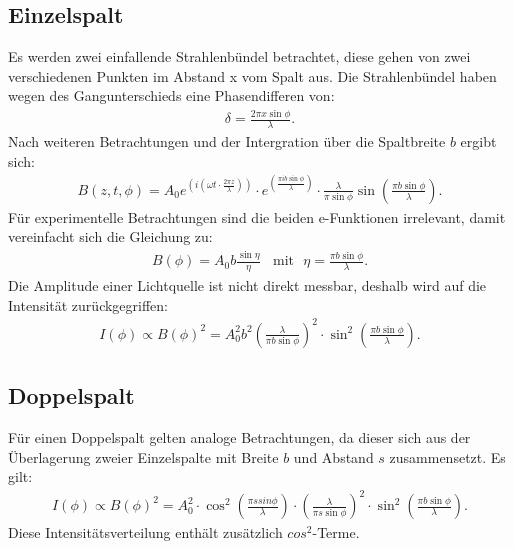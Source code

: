 \subsection{Einzelspalt}
Es werden zwei einfallende Strahlenbündel betrachtet, diese gehen von zwei verschiedenen Punkten im Abstand x vom
Spalt aus. Die Strahlenbündel haben wegen des Gangunterschieds eine Phasendifferen von:
\begin{align}
\delta = \frac{2\pi x \sin\phi}{\lambda}.
\end{align}
Nach weiteren Betrachtungen und der Intergration über die Spaltbreite $b$ ergibt sich:
\begin{align}
B(z,t,\phi)=A_0 e^{\left(i\left(\omega t\cdot\frac{2\pi z}{\lambda}\right)\right)}\cdot e^{\left(\frac{\pi i b\sin\phi}{\lambda}\right)}\cdot\frac{\lambda}{\pi\sin\phi}\sin\left(\frac{\pi b \sin\phi}{\lambda}\right).
\end{align}
Für experimentelle Betrachtungen sind die beiden e-Funktionen irrelevant, damit vereinfacht sich die Gleichung zu:
\begin{align}
B(\phi)=A_0 b \frac{\sin \eta}{\eta} \ \ \ \ \text{mit} \ \ \ \eta=\frac{\pi b \sin \phi}{\lambda}.
\end{align}
Die Amplitude einer Lichtquelle ist nicht direkt messbar, deshalb wird auf die Intensität zurückgegriffen:
\begin{align}
I(\phi)\propto B(\phi)^2 = A_0^2 b^2\left(\frac{\lambda}{\pi b \sin\phi}\right)^2\cdot\sin^2\left(\frac{\pi b \sin\phi}{\lambda}\right).\label{eqn:einzel}
\end{align}
\subsection{Doppelspalt}
Für einen Doppelspalt gelten analoge Betrachtungen, da dieser sich aus der Überlagerung zweier Einzelspalte
mit Breite $b$ und Abstand $s$ zusammensetzt. Es gilt:
\begin{align}
I(\phi) \propto B(\phi)^2 = A_0^2\cdot\cos^2\left(\frac{\pi s sin\phi}{\lambda}\right)\cdot\left(\frac{\lambda}{\pi s \sin\phi}\right)^2\cdot\sin^2\left(\frac{\pi b \sin\phi}{\lambda}\right).\label{eqn:dopp}
\end{align}
Diese Intensitätsverteilung enthält zusätzlich $cos^2$-Terme.
